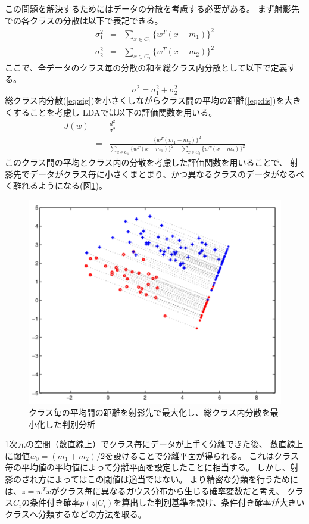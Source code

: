この問題を解決するためにはデータの分散を考慮する必要がある。
まず射影先での各クラスの分散は以下で表記できる。
\begin{eqnarray}
    \sigma^2_{1} & = & \sum_{x\in C_1}\{w^T(x-m_1)\}^2  \\
    \sigma^2_{2} & = & \sum_{x\in C_2}\{w^T(x-m_2)\}^2
\end{eqnarray}
ここで、全データのクラス毎の分散の和を総クラス内分散として以下で定義する。
\begin{equation}
    \sigma^2  = \sigma^2_1 + \sigma^2_2
    \label{eq:sig}
\end{equation}
総クラス内分散(\ref{eq:sig})を小さくしながらクラス間の平均の距離(\ref{eq:dis})を大きくすることを考慮し
LDAでは以下の評価関数を用いる。
\begin{eqnarray}
    J(w) & = & \frac{d^2}{\sigma^2} \nonumber \\
    & = & \frac{\{w^T(m_1-m_2)\}^2}{\sum_{x\in C_1}\{w^T(x-m_1)\}^2 + \sum_{x\in C_2}\{w^T(x-m_2)\}^2}
    \label{eq:lda_obj}
\end{eqnarray}
このクラス間の平均とクラス内の分散を考慮した評価関数を用いることで、
射影先でデータがクラス毎に小さくまとまり、かつ異なるクラスのデータがなるべく離れるようになる(図\ref{fig:var_dis})。
\begin{figure}
    \centering
    \includegraphics[width=12cm]{images/var_dis.png}
    \caption{クラス毎の平均間の距離を射影先で最大化し、総クラス内分散を最小化した判別分析\cite{BRML}}
    \label{fig:var_dis}
\end{figure}

1次元の空間（数直線上）でクラス毎にデータが上手く分離できた後、
数直線上に閾値\(w_0=(m_1+m_2)/2\)を設けることで分離平面が得られる。
これはクラス毎の平均値の平均値によって分離平面を設定したことに相当する。
しかし、射影のされ方によってはこの閾値は適当ではない。
より精密な分類を行うためには、\(z=w^Tx\)がクラス毎に異なるガウス分布から生じる確率変数だと考え、
クラス\(C_i\)の条件付き確率\(p(z|C_i)\)を算出した判別基準を設け、条件付き確率が大きいクラスへ分類するなどの方法を取る。


